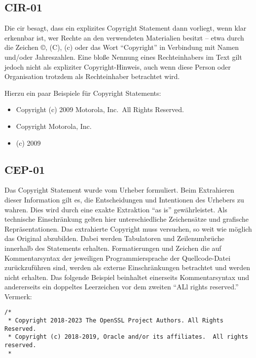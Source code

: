 
\subsection{CIR-01}\label{subsec:cir-01}

Die \gls{cir} besagt, dass ein explizites Copyright Statement dann vorliegt, wenn klar erkennbar ist, wer Rechte an den verwendeten Materialien besitzt -- etwa durch die Zeichen ©, (C), (c) oder das Wort \enquote{Copyright} in Verbindung mit Namen und/oder Jahreszahlen.
Eine bloße Nennung eines Rechteinhabers im Text gilt jedoch nicht als expliziter Copyright-Hinweis, auch wenn diese Person oder Organisation trotzdem als Rechteinhaber betrachtet wird.

Hierzu ein paar Beispiele für Copyright Statements:
\begin{itemize}
    \item Copyright (c) 2009 Motorola, Inc.\ All Rights Reserved.
    \item Copyright Motorola, Inc.
    \item (c) 2009
\end{itemize}


\subsection{CEP-01}\label{subsec:cep-01}

Das Copyright Statement wurde vom Urheber formuliert.
Beim Extrahieren dieser Information gilt es, die Entscheidungen und Intentionen des Urhebers zu wahren.
Dies wird durch eine exakte Extraktion \enquote{as is} gewährleistet.
Als technische Einschränkung gelten hier unterschiedliche Zeichensätze und grafische Repräsentationen.
Das extrahierte Copyright muss versuchen, so weit wie möglich das Original abzubilden.
Dabei werden Tabulatoren und Zeilenumbrüche innerhalb des Statements erhalten.
Formatierungen und Zeichen die auf Kommentarsyntax der jeweiligen Programmiersprache der Quellcode-Datei zurückzuführen sind, werden als externe Einschränkungen betrachtet und werden nicht erhalten.
Das folgende Beispiel beinhaltet einerseits Kommentarsyntax und andererseits ein doppeltes Leerzeichen vor dem zweiten \enquote{ALl rights reserved.} Vermerk:
\begin{lstlisting}[numbers=none, keepspaces=true]
/*
 * Copyright 2018-2023 The OpenSSL Project Authors. All Rights Reserved.
 * Copyright (c) 2018-2019, Oracle and/or its affiliates.  All rights reserved.
 *
\end{lstlisting}

